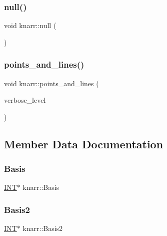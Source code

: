 \mbox{\label{classknarr_a0404c8ec7f109c15730d2c61f2cfe4d8}} 
\subsubsection{\texorpdfstring{null()}{null()}}
{\footnotesize\ttfamily void knarr\+::null (\begin{DoxyParamCaption}{ }\end{DoxyParamCaption})}

\mbox{\label{classknarr_abb50a19df35495d508b0cb127d4eb908}} 
\subsubsection{\texorpdfstring{points\+\_\+and\+\_\+lines()}{points\_and\_lines()}}
{\footnotesize\ttfamily void knarr\+::points\+\_\+and\+\_\+lines (\begin{DoxyParamCaption}\item[{\mbox{\hyperlink{galois_8h_a09fddde158a3a20bd2dcadb609de11dc}{I\+NT}}}]{verbose\+\_\+level }\end{DoxyParamCaption})}



\subsection{Member Data Documentation}
\mbox{\label{classknarr_add68481c45ca4309285991525d4a3561}} 
\subsubsection{\texorpdfstring{Basis}{Basis}}
{\footnotesize\ttfamily \mbox{\hyperlink{galois_8h_a09fddde158a3a20bd2dcadb609de11dc}{I\+NT}}$\ast$ knarr\+::\+Basis}

\mbox{\label{classknarr_a11fca253d8533fab23f02f9c061860f1}} 
\subsubsection{\texorpdfstring{Basis2}{Basis2}}
{\footnotesize\ttfamily \mbox{\hyperlink{galois_8h_a09fddde158a3a20bd2dcadb609de11dc}{I\+NT}}$\ast$ knarr\+::\+Basis2}

